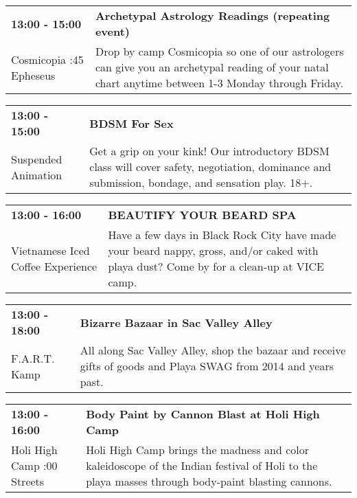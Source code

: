 \begin{tabular}{ p{1in} p{2.2in} }
    \textbf{13:00 - 15:00} & \textbf{Archetypal Astrology Readings (repeating event)} \\
    Cosmicopia \newline 3:45 Epheseus & Drop by camp Cosmicopia so one of our astrologers can give you an archetypal reading of your natal chart anytime between 1-3 Monday through Friday. \\
    \hline 
\end{tabular}
    
\begin{tabular}{ p{1in} p{2.2in} }
    \textbf{13:00 - 15:00} & \textbf{BDSM For Sex} \\
    Suspended Animation \newline  & Get a grip on your kink! Our introductory BDSM class will cover safety, negotiation, dominance and submission, bondage, and sensation play. 18+. \\
    \hline 
\end{tabular}
    
\begin{tabular}{ p{1in} p{2.2in} }
    \textbf{13:00 - 16:00} & \textbf{BEAUTIFY YOUR BEARD SPA} \\
    Vietnamese Iced Coffee Experience \newline  & Have a few days in Black Rock City have made your beard nappy, gross, and/or caked with playa dust? Come by for a clean-up at VICE camp. \\
    \hline 
\end{tabular}
    
\begin{tabular}{ p{1in} p{2.2in} }
    \textbf{13:00 - 18:00} & \textbf{Bizarre Bazaar in Sac Valley Alley} \\
    F.A.R.T. Kamp \newline  & All along Sac Valley Alley, shop the bazaar and receive gifts of goods and Playa SWAG from 2014 and years past. \\
    \hline 
\end{tabular}
    
\begin{tabular}{ p{1in} p{2.2in} }
    \textbf{13:00 - 16:00} & \textbf{Body Paint by Cannon Blast at Holi High Camp} \\
    Holi High Camp \newline 3:00 Streets & Holi High Camp brings the madness and color kaleidoscope of the Indian festival of Holi to the playa masses through body-paint blasting cannons. \\
    \hline 
\end{tabular}
    
